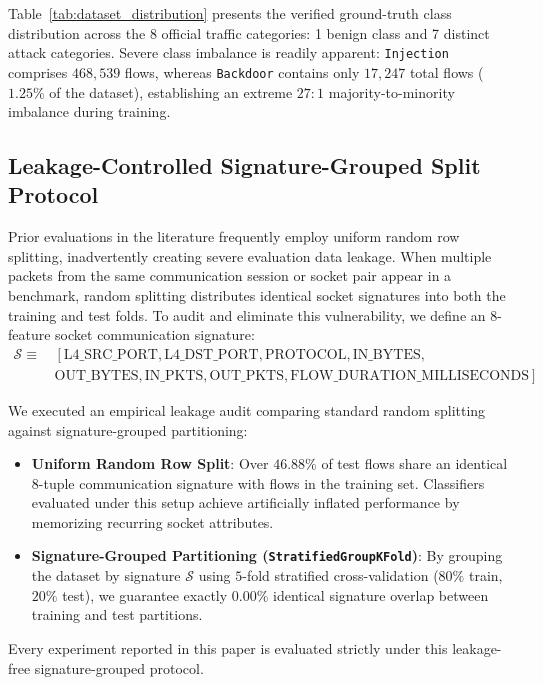 \documentclass[journal,onecolumn]{IEEEtran}
\begin{document}
Table~\ref{tab:dataset_distribution} presents the verified ground-truth class distribution across the 8 official traffic categories: 1 benign class and 7 distinct attack categories. Severe class imbalance is readily apparent: \texttt{Injection} comprises $468,539$ flows, whereas \texttt{Backdoor} contains only $17,247$ total flows ($1.25\%$ of the dataset), establishing an extreme $27:1$ majority-to-minority imbalance during training.

\subsection{Leakage-Controlled Signature-Grouped Split Protocol}
Prior evaluations in the literature frequently employ uniform random row splitting, inadvertently creating severe evaluation data leakage. When multiple packets from the same communication session or socket pair appear in a benchmark, random splitting distributes identical socket signatures into both the training and test folds. To audit and eliminate this vulnerability, we define an 8-feature socket communication signature:
\begin{align*}
\mathcal{S} \equiv &\, \left[ \text{L4\_SRC\_PORT}, \text{L4\_DST\_PORT}, \text{PROTOCOL}, \text{IN\_BYTES}, \right. \\
&\, \left. \text{OUT\_BYTES}, \text{IN\_PKTS}, \text{OUT\_PKTS}, \text{FLOW\_DURATION\_MILLISECONDS} \right]
\end{align*}

We executed an empirical leakage audit comparing standard random splitting against signature-grouped partitioning:
\begin{itemize}
    \item \textbf{Uniform Random Row Split}: Over $46.88\%$ of test flows share an identical 8-tuple communication signature with flows in the training set. Classifiers evaluated under this setup achieve artificially inflated performance by memorizing recurring socket attributes.
    \item \textbf{Signature-Grouped Partitioning (\texttt{StratifiedGroupKFold})}: By grouping the dataset by signature $\mathcal{S}$ using $5$-fold stratified cross-validation ($80\%$ train, $20\%$ test), we guarantee exactly $\mathbf{0.00\%}$ identical signature overlap between training and test partitions.
\end{itemize}
Every experiment reported in this paper is evaluated strictly under this leakage-free signature-grouped protocol.
\end{document}
